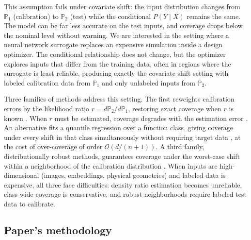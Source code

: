 \documentclass[10pt]{article}
\begin{document}
This assumption fails under covariate shift: the input distribution changes from
$\mathbb{P}_1$ (calibration) to $\mathbb{P}_2$ (test) while the conditional $P(Y \mid X)$
remains the same. The model can be far less accurate on the test inputs, and coverage
drops below the nominal level without warning. We are interested in the setting where a
neural network surrogate replaces an expensive simulation inside a design optimizer. The
conditional relationship does not change, but the optimizer explores inputs that differ
from the training data, often in regions where the surrogate is least reliable, producing
exactly the covariate shift setting with labeled calibration data from $\mathbb{P}_1$ and
only unlabeled inputs from $\mathbb{P}_2$.

\vspace{-0.25em}

Three families of methods address this setting. The first reweights calibration errors by
the likelihood ratio $r = d\mathbb{P}_2/d\mathbb{P}_1$, restoring exact coverage when $r$
is known \cite{tibshirani2019conformal}. When $r$ must be estimated, coverage degrades
with the estimation error \cite{lei2021conformal, yang2024doubly}. An alternative fits a
quantile regression over a function class, giving coverage under every shift in that class
simultaneously without requiring target data \cite{gibbs2025conformal}, at the cost of
over-coverage of order $\mathcal{O}(d/(n{+}1))$. A third family, distributionally robust
methods, guarantees coverage under the worst-case shift within a neighborhood of the
calibration distribution \cite{aolaritei2026conformal}. When inputs are high-dimensional
(images, embeddings, physical geometries) and labeled data is expensive, all three face
difficulties: density ratio estimation becomes unreliable, class-wide coverage is
conservative, and robust neighborhoods require labeled test data to calibrate.

\subsection*{Paper's methodology}

\vspace{-0.25em}
\end{document}
